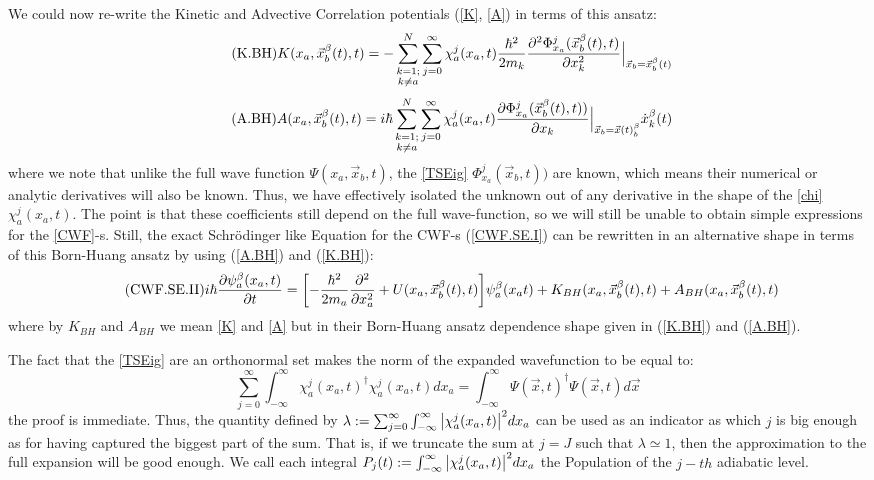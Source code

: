 \documentclass[11pt, a4paper]{article} %
\begin{document}
We could now re-write the Kinetic and Advective Correlation potentials (\ref{K}, \ref{A}) in terms of this ansatz:
\begin{equation}\label{K.BH}\tag{K.BH}
K(x_a, \vec{x}_b^\beta(t), t) = -  \sum_{\substack{k=1; \\ k\neq a}}^{N} \sum_{j=0}^\infty \chi_a^j(x_a,t) \frac{\hbar^2}{2m_k} \pdv[2]{ \Phi_{x_a}^j(\vec{x}_b^\beta(t),t)}{x_k}\Big\rvert_{\vec{x}_b=\vec{x}_b^\beta(t)}
\end{equation}
\begin{equation}\label{A.BH}\tag{A.BH}
A(x_a, \vec{x}_b^\beta(t), t) =  i \hbar \sum_{\substack{k=1; \\ k\neq a}}^{N} \sum_{j=0}^\infty \chi_a^j(x_a,t) \pdv{ \Phi_{x_a}^j(\vec{x}_b^\beta(t),t))}{x_k}\Big\rvert_{\vec{x}_b=\vec{x}(t)_b^\beta} \dot{x}_k^\beta(t)
\end{equation}
where we note that unlike the full wave function $\Psi(x_a, \vec{x}_b,t)$, the \ref{TSEig} $\Phi_{x_a}^j(\vec{x}_b,t))$ are known, which means their numerical or analytic derivatives will also be known. Thus, we have effectively isolated the unknown out of any derivative in the shape of the \ref{chi} $\chi^j_a(x_a,t)$. The point is that these coefficients still depend on the full wave-function, so we will still be unable to obtain simple expressions for the \ref{CWF}-s. Still, the exact Schrödinger like Equation for the CWF-s (\ref{CWF.SE.I}) can be rewritten in an alternative shape in terms of this Born-Huang ansatz by using (\ref{A.BH}) and (\ref{K.BH}):
\begin{equation}\label{CWF.SE.II}\tag{CWF.SE.II}
i\hbar \pdv{\psi_a^\beta(x_a, t)}{t} = \qty[- \frac{\hbar^2}{2m_a}\pdv[2]{}{x_a} + U(x_a, \vec{x}_b^\beta(t), t)]\psi_a^\beta(x_a t) + K_{BH}(x_a, \vec{x}_b^\beta(t), t) +A_{BH}(x_a, \vec{x}_b^\beta(t), t) 
\end{equation}
where by $ K_{BH}$ and $ A_{BH}$ we mean \ref{K} and \ref{A} but in their Born-Huang ansatz dependence shape given in (\ref{K.BH}) and (\ref{A.BH}).

The fact that the \ref{TSEig} are an orthonormal set makes the norm of the expanded wavefunction to be equal to:
$$
\sum_{j=0}^\infty \int_{-\infty}^\infty \chi_a^j(x_a,t)^\dagger \chi_a^j(x_a,t) dx_a = \int_{-\infty}^\infty \Psi(\vec{x},t)^\dagger \Psi(\vec{x},t)d\vec{x}
$$
the proof is immediate. Thus, the quantity defined by $\lambda:=\sum_{j=0}^\infty \int_{-\infty}^\infty \qty|\chi_a^j(x_a,t)|^2 dx_a$ can be used as an indicator as which $j$ is big enough as for having captured the biggest part of the sum. That is, if we truncate the sum at $j=J$ such that $\lambda\simeq 1$, then the approximation to the full expansion will be good enough. We call each integral $P_j(t):=\int_{-\infty}^\infty \qty|\chi_a^j(x_a,t)|^2 dx_a$ the Population of the $j-th$ adiabatic level.
\newpage
\end{document}
